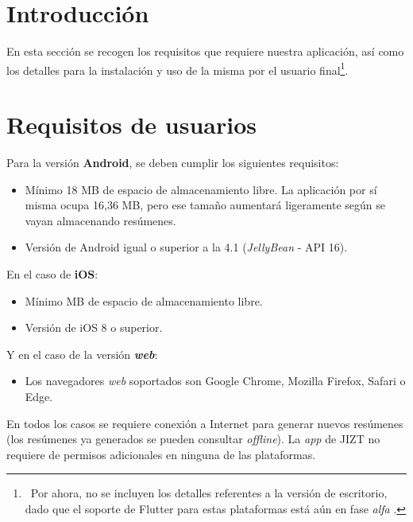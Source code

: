 
\section{Introducción}

En esta sección se recogen los requisitos que requiere nuestra aplicación, así como los detalles para la instalación y uso de la misma por el usuario final\footnote{\, Por ahora, no se incluyen los detalles referentes a la versión de escritorio, dado que el soporte de Flutter para estas plataformas está aún en fase \emph{alfa} \cite{flutter-desktop}.}.

\section{Requisitos de usuarios}

Para la versión \textbf{Android}, se deben cumplir los siguientes requisitos:

\vspace{-0.3cm}
\begin{itemize} [\textbullet]
	\item Mínimo 18 MB de espacio de almacenamiento libre. La aplicación por sí misma ocupa 16,36 MB, pero ese tamaño aumentará ligeramente según se vayan almacenando resúmenes.
	
	\item Versión de Android igual o superior a la 4.1 (\emph{JellyBean} - API 16).
\end{itemize}

En el caso de \textbf{iOS}:

\vspace{-0.3cm}
\begin{itemize} [\textbullet]
	\item Mínimo MB de espacio de almacenamiento libre.
	\item Versión de iOS 8 o superior.
\end{itemize}

Y en el caso de la versión \emph{\textbf{web}}:

\begin{itemize} [\textbullet]
	\item Los navegadores \emph{web} soportados son Google Chrome, Mozilla Firefox, Safari o Edge.
\end{itemize}

En todos los casos se requiere conexión a Internet para generar nuevos resúmenes (los resúmenes ya generados se pueden consultar \emph{offline}). La \emph{app} de JIZT no requiere de permisos adicionales en ninguna de las plataformas.

